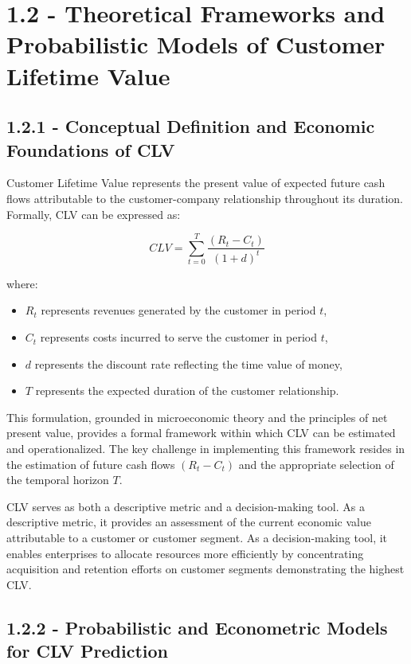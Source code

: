 \documentclass[12pt,a4paper,oneside]{report}
\begin{document}
\section{1.2 - Theoretical Frameworks and Probabilistic Models of Customer Lifetime Value}

\subsection{1.2.1 - Conceptual Definition and Economic Foundations of CLV}

Customer Lifetime Value represents the present value of expected future cash flows attributable to the customer-company relationship throughout its duration. Formally, CLV can be expressed as:

\begin{equation}
CLV = \sum_{t=0}^{T} \frac{(R_t - C_t)}{(1+d)^t}
\label{eq:clv_general}
\end{equation}

where:
\begin{itemize}
\item $R_t$ represents revenues generated by the customer in period $t$,
\item $C_t$ represents costs incurred to serve the customer in period $t$,
\item $d$ represents the discount rate reflecting the time value of money,
\item $T$ represents the expected duration of the customer relationship.
\end{itemize}

This formulation, grounded in microeconomic theory and the principles of net present value, provides a formal framework within which CLV can be estimated and operationalized. The key challenge in implementing this framework resides in the estimation of future cash flows $(R_t - C_t)$ and the appropriate selection of the temporal horizon $T$.

CLV serves as both a descriptive metric and a decision-making tool. As a descriptive metric, it provides an assessment of the current economic value attributable to a customer or customer segment. As a decision-making tool, it enables enterprises to allocate resources more efficiently by concentrating acquisition and retention efforts on customer segments demonstrating the highest CLV.

\subsection{1.2.2 - Probabilistic and Econometric Models for CLV Prediction}
\end{document}
